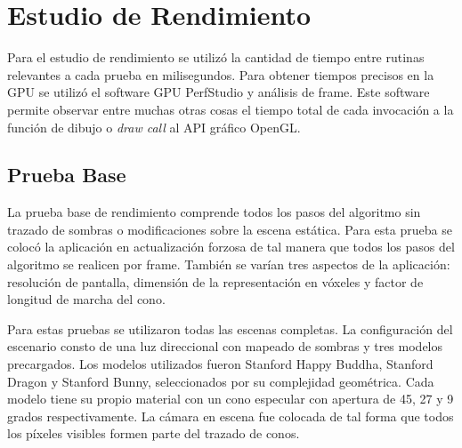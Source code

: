 \section{Estudio de Rendimiento}

Para el estudio de rendimiento se utilizó la cantidad de tiempo entre rutinas relevantes a cada prueba en milisegundos. Para obtener tiempos precisos en la \ac{GPU} se utilizó el software GPU PerfStudio y análisis de frame. Este software permite observar entre muchas otras cosas el tiempo total de cada invocación a la función de dibujo o \emph{draw call} al API gráfico OpenGL.

\subsection{Prueba Base}
La prueba base de rendimiento comprende todos los pasos del algoritmo sin trazado de sombras o modificaciones sobre la escena estática. Para esta prueba se colocó la aplicación en actualización forzosa de tal manera que todos los pasos del algoritmo se realicen por frame. También se varían tres aspectos de la aplicación: resolución de pantalla, dimensión de la representación en vóxeles y factor de longitud de marcha del cono.

Para estas pruebas se utilizaron todas las escenas completas. La configuración del escenario consto de una luz direccional con mapeado de sombras y tres modelos precargados. Los modelos utilizados fueron Stanford Happy Buddha, Stanford Dragon y Stanford Bunny, seleccionados por su complejidad geométrica. Cada modelo tiene su propio material con un cono especular con apertura de 45, 27 y 9 grados respectivamente. La cámara en escena fue colocada de tal forma que todos los píxeles  visibles formen parte del trazado de conos. 

